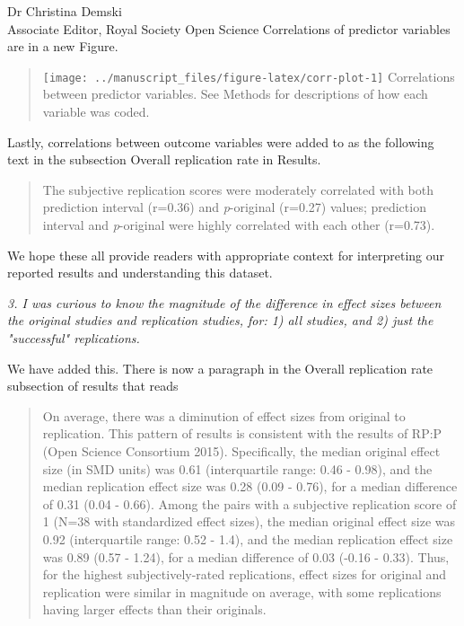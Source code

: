 \documentclass{stanfordletter}
\newcommand{\theysaid}[1]{\begin{leftbar} \noindent 
		\textsl{ #1}\end{leftbar}}
\newcommand{\revised}[1]{\begin{quote}	#1 \end{quote}}
\begin{document}
\begin{letter}{Dr Christina Demski \\ Associate Editor, Royal Society Open Science}
          Correlations of predictor variables are in a new Figure. 
          
          \revised{
          		\texttt{[image: ../manuscript\_files/figure-latex/corr-plot-1]}
          		{Correlations between predictor variables. See Methods for descriptions of how each variable was coded. }
         }
         
         Lastly, correlations between outcome variables were added to as the following text in the subsection Overall replication rate in Results.
         
         \revised{The subjective replication scores were moderately correlated with both prediction interval (r=0.36) and \emph{p}-original (r=0.27) values; prediction interval and \emph{p}-original were highly correlated with each other (r=0.73).
         }
         
         We hope these all provide readers with appropriate context for interpreting our reported results and understanding this dataset. 
          
          \theysaid{
          	3. I was curious to know the magnitude of the difference in effect sizes between the original studies and replication studies, for: 1) all studies, and 2) just the "successful" replications.
          }
          
          We have added this. There is now a paragraph in the Overall replication rate subsection of results that reads
          
          \revised{On average, there was a diminution of effect sizes from original to replication. This pattern of results is consistent with the results of RP:P (Open Science Consortium 2015). Specifically, the median original effect size (in SMD units) was 0.61 (interquartile range: 0.46 - 0.98), and the median replication effect size was 0.28 (0.09 - 0.76), for a median difference of 0.31 (0.04 - 0.66). Among the pairs with a subjective replication score of 1 (N=38 with standardized effect sizes), the median original effect size was 0.92 (interquartile range: 0.52 - 1.4), and the median replication effect size was 0.89 (0.57 - 1.24), for a median difference of 0.03 (-0.16 - 0.33). Thus, for the highest subjectively-rated replications, effect sizes for original and replication were similar in magnitude on average, with some replications having larger effects than their originals.
          }
          
          
          

\end{letter}
\end{document}
